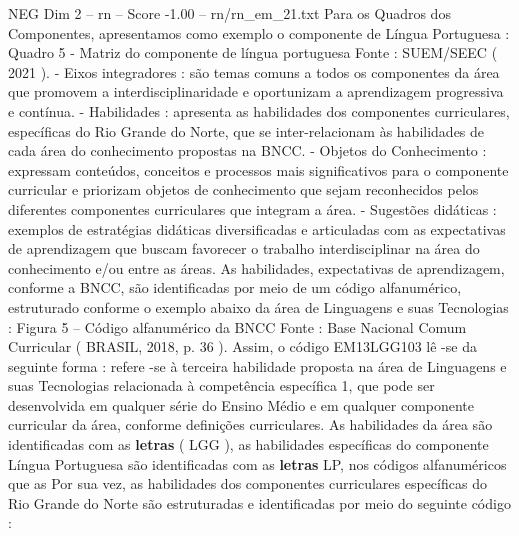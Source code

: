 \begin{textsample}{NEG Dim 2 – rn – Score -1.00 – rn/rn\_em\_21.txt}
Para os Quadros dos Componentes, apresentamos como exemplo o componente de Língua Portuguesa : Quadro 5 - Matriz do componente de língua portuguesa Fonte : SUEM/SEEC ( 2021 ). - Eixos integradores : são temas comuns a todos os componentes da área que promovem a interdisciplinaridade e oportunizam a aprendizagem progressiva e contínua. - Habilidades : apresenta as habilidades dos componentes curriculares, específicas do Rio Grande do Norte, que se inter-relacionam às habilidades de cada área do conhecimento propostas na BNCC. - Objetos do Conhecimento : expressam conteúdos, conceitos e processos mais significativos para o componente curricular e priorizam objetos de conhecimento que sejam reconhecidos pelos diferentes componentes curriculares que integram a área. - Sugestões didáticas : exemplos de estratégias didáticas diversificadas e articuladas com as expectativas de aprendizagem que buscam favorecer o trabalho interdisciplinar na área do conhecimento e/ou entre as áreas.
As habilidades, expectativas de aprendizagem, conforme a BNCC, são identificadas por meio de um código alfanumérico, estruturado conforme o exemplo abaixo da área de Linguagens e suas Tecnologias : Figura 5 – Código alfanumérico da BNCC Fonte : Base Nacional Comum Curricular ( BRASIL, 2018, p. 36 ).
Assim, o código EM13LGG103 lê -se da seguinte forma : refere -se à terceira habilidade proposta na área de Linguagens e suas Tecnologias relacionada à competência específica 1, que pode ser desenvolvida em qualquer série do Ensino Médio e em qualquer componente curricular da área, conforme definições curriculares.
As habilidades da área são identificadas com as \textbf{letras} ( LGG ), as habilidades específicas do componente Língua Portuguesa são identificadas com as \textbf{letras} LP, nos códigos alfanuméricos que as Por sua vez, as habilidades dos componentes curriculares específicas do Rio Grande do Norte são estruturadas e identificadas por meio do seguinte código :

\end{textsample}
